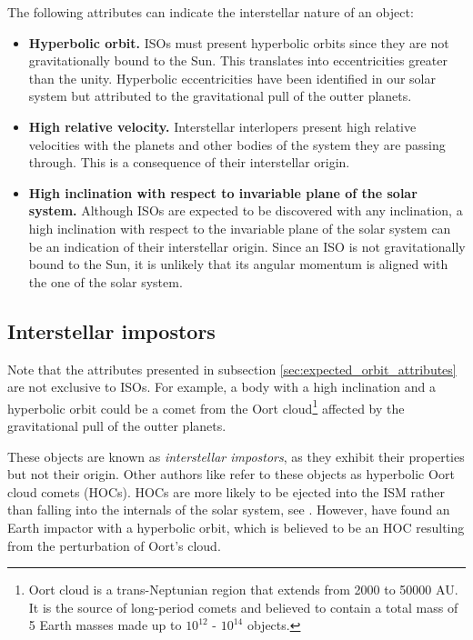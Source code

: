 The following attributes can indicate the interstellar nature of an object:

\begin{itemize}
  \item \textbf{Hyperbolic orbit.} ISOs must present hyperbolic orbits since
        they are not gravitationally bound to the Sun. This translates into
        eccentricities greater than the unity. Hyperbolic eccentricities have
        been identified in our solar system but attributed to the gravitational
        pull of the outter planets.
  \item \textbf{High relative velocity.} Interstellar interlopers present high relative
        velocities with the planets and other bodies of the system they are
        passing through. This is a consequence of their interstellar origin.
  \item \textbf{High inclination with respect to invariable plane of the solar
          system.} Although ISOs are expected to be discovered with any
        inclination, a high inclination with respect to the invariable plane of
        the solar system can be an indication of their interstellar origin.
        Since an ISO is not gravitationally bound to the Sun, it is unlikely
        that its angular momentum is aligned with the one of the solar system.
\end{itemize}

\subsection{Interstellar impostors}

Note that the attributes presented in subsection
\ref{sec:expected_orbit_attributes} are not exclusive to ISOs. For example, a
body with a high inclination and a hyperbolic orbit could be a comet from the
Oort cloud\footnote{ Oort cloud is a trans-Neptunian region that extends from
  2000 to 50000 AU. It is the source of long-period comets and believed to contain
  a total mass of 5 Earth masses made up to $10^{12}$ - $10^{14}$ objects. }
affected by the gravitational pull of the outter planets.

These objects are known as \textit{interstellar impostors}, as they exhibit
their properties but not their origin. Other authors like \cite{higuchi2020}
refer to these objects as hyperbolic Oort cloud comets (HOCs). HOCs are more
likely to be ejected into the ISM rather than falling into the internals of the
solar system, see \cite{francis2005}. However, \cite{eloy2024} have found an
Earth impactor with a hyperbolic orbit, which is believed to be an HOC resulting
from the perturbation of Oort's cloud.
